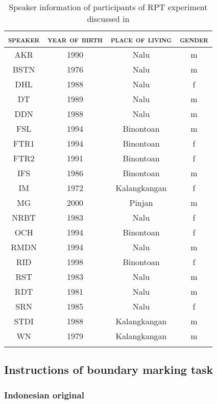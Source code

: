 \begin{table}
\caption{Speaker information of participants of RPT experiment discussed in  }
\label{Speaker_RPT}
	\begin{tabular}{cccc}
						\lsptoprule
		\textsc{speaker}   & \textsc{year of birth}       & \textsc{place of living} & \textsc{gender} \\
				\midrule
		AKR  & 1990 & Nalu         & m \\
BSTN & 1976 & Nalu         & m \\
DHL  & 1988 & Nalu         & f \\
DT   & 1989 & Nalu         & m \\
DDN  & 1988 & Nalu         & m \\
FSL  & 1994 & Binontoan    & m \\
FTR1 & 1994 & Binontoan    & f \\
FTR2 & 1991 & Binontoan    & f \\
IFS  & 1986 & Binontoan    & m \\
IM   & 1972 & Kalangkangan & f \\
MG   & 2000 & Pinjan       & m \\
NRBT & 1983 & Nalu         & f \\
OCH  & 1994 & Binontoan    & f \\
RMDN & 1994 & Nalu         & m \\
RID  & 1998 & Binontoan    & f \\
RST  & 1983 & Nalu         & m \\
RDT  & 1981 & Nalu         & m \\
SRN  & 1985 & Nalu         & f \\
STDI & 1988 & Kalangkangan & m \\
WN   & 1979 & Kalangkangan & m\\
		\lspbottomrule
	\end{tabular}
\end{table}


\subsection{Instructions of boundary marking task}
\label{Instructions boundaries}

\subsubsection{Indonesian original}
\label{Instructions_b_IND}


